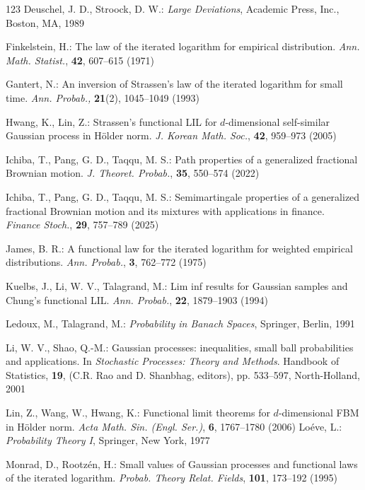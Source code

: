 \documentclass[11pt, reqno]{amsart}
\numberwithin{equation}{section}
\newcommand{\1}{{\bf 1}}
\newcommand{\2}{{\bf 2}}
\begin{document}
\begin{thebibliography}{123}
 Deuschel,  J. D.,         Stroock, D. W.: {\it Large Deviations},  Academic Press, Inc., Boston, MA, 1989
 
  Finkelstein, H.: The law of the iterated logarithm for empirical distribution.  {\it Ann. Math. Statist.},  {\bf 42},  607--615 (1971)

  Gantert, N.: An inversion of Strassen's law of the iterated logarithm for small time. {\it Ann.   Probab.,}
{\bf 21}(2), 1045--1049  (1993)




  Hwang,  K.,     Lin, Z.: Strassen's functional LIL for $d$-dimensional self-similar Gaussian process in H\"older norm.
 {\it J. Korean Math. Soc.},  {\bf 42}, 959--973  (2005)

 

   Ichiba,  T.,    Pang, G. D.,      Taqqu, M. S.: Path properties of a generalized fractional Brownian motion.
{\it J. Theoret. Probab.},   {\bf 35},  550--574 (2022)

Ichiba,  T.,    Pang, G. D.,      Taqqu, M. S.:  Semimartingale properties of a generalized
fractional Brownian motion and its mixtures with applications in finance. {\it Finance Stoch.},  {\bf 29}, 757--789 (2025)

 James, B. R.:  A functional law for the iterated logarithm for weighted empirical distributions. 
{\it Ann. Probab.}, {\bf 3}, 762--772 (1975)

  Kuelbs,  J.,   Li, W. V.,     Talagrand, M.:  Lim inf results for Gaussian samples and Chung's functional LIL.
  {\it Ann. Probab.}, {\bf 22}, 1879--1903 (1994)

 Ledoux, M.,    Talagrand, M.: {\it Probability in Banach Spaces},  Springer, Berlin, 1991 

Li, W. V.,   Shao,  Q.-M.: Gaussian processes: inequalities,
small ball probabilities and applications. In {\it Stochastic
Processes: Theory and Methods}. Handbook of Statistics,
{\bf 19}, (C.R. Rao and D. Shanbhag, editors), pp. 533--597,
North-Holland,  2001 


  Lin, Z.,    Wang, W.,     Hwang, K.: Functional limit theorems for $d$-dimensional FBM in H\"older norm.
{\it Acta Math. Sin. (Engl. Ser.)}, {\bf 6}, 1767--1780 (2006)
Lo\'eve, L.: {\it Probability Theory I}, Springer, New York, 1977

 Monrad,  D.,   Rootz\'en, H.: Small values of Gaussian processes and functional laws of the iterated logarithm.
{\it Probab. Theory Relat. Fields},  {\bf101}, 173--192 (1995)






\end{thebibliography}
\end{document}
